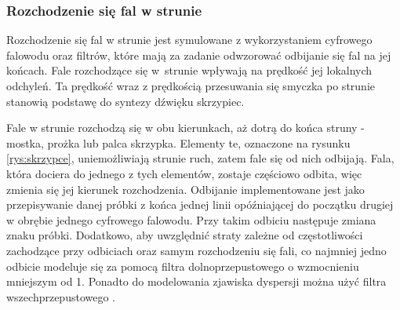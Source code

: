 \subsubsection{Rozchodzenie się fal w strunie}
Rozchodzenie się fal w strunie jest symulowane z wykorzystaniem cyfrowego falowodu oraz filtrów, które mają za zadanie odwzorować odbijanie się fal na jej końcach. Fale rozchodzące się w~strunie wpływają na prędkość jej lokalnych odchyleń. Ta prędkość wraz z prędkością przesuwania się smyczka po strunie stanowią podstawę do syntezy dźwięku skrzypiec. 


Fale w strunie rozchodzą się w obu kierunkach, aż dotrą do końca struny - mostka, prożka lub palca skrzypka. Elementy te, oznaczone na rysunku \ref{rys:skrzypce}, uniemożliwiają strunie ruch, zatem fale się od nich odbijają. Fala, która dociera do jednego z tych elementów, zostaje częściowo odbita, więc zmienia się jej kierunek rozchodzenia. Odbijanie implementowane jest jako przepisywanie danej próbki z końca jednej linii opóźniającej do początku drugiej w obrębie jednego cyfrowego falowodu. Przy takim odbiciu następuje zmiana znaku próbki.
Dodatkowo, aby uwzględnić straty zależne od częstotliwości zachodzące przy odbiciach oraz samym rozchodzeniu się fali, co najmniej jedno odbicie modeluje się za pomocą filtra dolnoprzepustowego o wzmocnieniu mniejszym od 1. 
Ponadto do modelowania zjawiska dyspersji można użyć filtra wszechprzepustowego \cite{allpass}.


